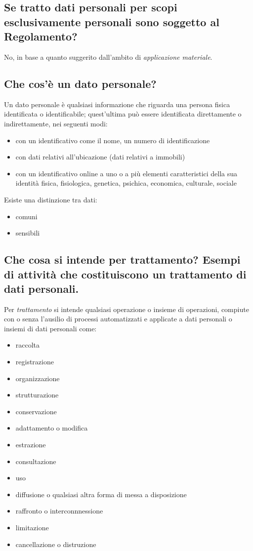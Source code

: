 \subsection{Se tratto dati personali per scopi esclusivamente personali sono soggetto al Regolamento?}
No, in base a quanto suggerito dall'ambito di \textit{applicazione materiale}.


\subsection{Che cos’è un dato personale?}
Un dato personale è qualsiasi informazione che riguarda una persona fisica identificata o identificabile;
quest'ultima può essere identificata direttamente o indirettamente, nei seguenti modi:
\begin{itemize}
    \item con un identificativo come il nome, un numero di identificazione
    \item con dati relativi all'ubicazione (dati relativi a immobili)
    \item con un identificativo online a uno o a più elementi caratteristici della sua identità fisica, fisiologica, genetica, psichica, economica, culturale, sociale
\end{itemize}
Esiste una distinzione tra dati:
\begin{itemize}
    \item comuni
    \item sensibili
\end{itemize}

\subsection{Che cosa si intende per trattamento? Esempi di attività che costituiscono un trattamento di
dati personali.}
Per \textit{trattamento} si intende qualsiasi operazione o insieme di operazioni, compiute con o senza l'ausilio di processi automatizzati e applicate a dati personali o insiemi di dati personali come:
\begin{itemize}
    \item raccolta
    \item registrazione
    \item organizzazione
    \item strutturazione
    \item conservazione
    \item adattamento o modifica
    \item estrazione
    \item consultazione
    \item uso
    \item diffusione o qualsiasi altra forma di messa a disposizione
    \item raffronto o interconnnessione
    \item limitazione
    \item cancellazione o distruzione
\end{itemize}

